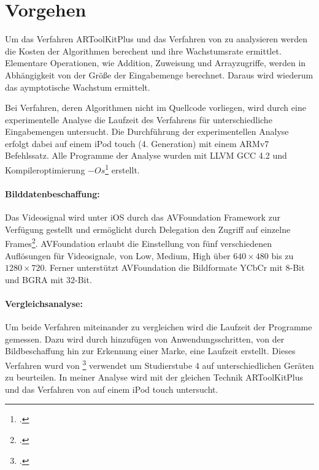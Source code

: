 \section{Vorgehen} %
\label{sec:vorgehen}
\begin{comment}
	Vorgehen: Analysemethoden vorstellen wie Algorithmen untersucht werden.
	Vergleich O-Notation
	Laufzeitanalyse
	Gleiche Kriterien (selbes Bild, selbes Video)
\end{comment}

Um das Verfahren ARToolKitPlus und das Verfahren von \citeauthor{hirzer08} zu analysieren werden die Kosten der
 Algorithmen berechent und ihre Wachstumsrate ermittlet. Elementare Operationen, wie Addition, Zuweisung und
 Arrayzugriffe, werden in Abhängigkeit von der Größe der Eingabemenge berechnet. Daraus wird wiederum das aymptotische
 Wachstum ermittelt.

Bei Verfahren, deren Algorithmen nicht im Quellcode vorliegen, wird durch eine experimentelle Analyse die Laufzeit des
 Verfahrens für unterschiedliche Eingabemengen untersucht. Die Durchführung der experimentellen Analyse erfolgt dabei
 auf einem iPod touch (4. Generation) mit einem ARMv7 Befehlssatz. Alle Programme der Analyse wurden mit LLVM GCC 4.2
 und Kompileroptimierung $\mathit{-Os}$\footcite[Vgl.][]{cc} erstellt.

\paragraph{Bilddatenbeschaffung:} %
\label{par:bilddatenbeschaffung}
Das Videosignal wird unter iOS durch das AVFoundation Framework zur Verfügung gestellt und ermöglicht durch Delegation
 den Zugriff auf einzelne Frames\footcite{avfoundation}. AVFoundation erlaubt die Einstellung von fünf verschiedenen
 Auflösungen für Videosignale, von Low, Medium, High über $640 \times 480$ bis zu $1280 \times 720$. Ferner unterstützt
 AVFoundation die Bildformate YCbCr mit $8$-Bit und BGRA mit $32$-Bit.

\paragraph{Vergleichsanalyse:} %
\label{par:vergleichsanalyse}
Um beide Verfahren miteinander zu vergleichen wird die Laufzeit der Programme gemessen. Dazu wird durch hinzufügen von
 Anwendungsschritten, von der Bildbeschaffung hin zur Erkennung einer Marke, eine Laufzeit erstellt. Dieses Verfahren
 wurd von \citeauthor{wagner09b}\footcite[Vgl.][]{wagner09b} verwendet um Studierstube 4 auf unterschiedlichen Geräten
 zu beurteilen. In meiner Analyse wird mit der gleichen Technik ARToolKitPlus und das Verfahren von
 \citeauthor{hirzer08} auf einem iPod touch untersucht.

